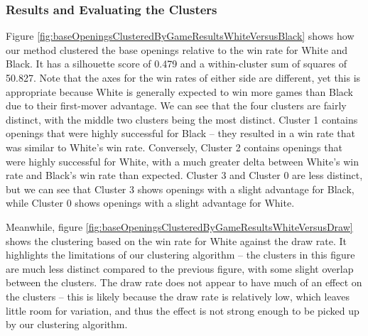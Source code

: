 \documentclass[a4paper, 11pt]{article}
\begin{document}
\subsubsection{Results and Evaluating the Clusters}
Figure \ref{fig:baseOpeningsClusteredByGameResultsWhiteVersusBlack} shows how our method clustered the base openings relative to the win rate for White and Black. It has a silhouette score of 0.479 and a within-cluster sum of squares of 50.827. Note that the axes for the win rates of either side are different, yet this is appropriate because White is generally expected to win more games than Black due to their first-mover advantage. We can see that the four clusters are fairly distinct, with the middle two clusters being the most distinct. Cluster 1 contains openings that were highly successful for Black -- they resulted in a win rate that was similar to White's win rate. Conversely, Cluster 2 contains openings that were highly successful for White, with a much greater delta between White's win rate and Black's win rate than expected. Cluster 3 and Cluster 0 are less distinct, but we can see that Cluster 3 shows openings with a slight advantage for Black, while Cluster 0 shows openings with a slight advantage for White.

Meanwhile, figure \ref{fig:baseOpeningsClusteredByGameResultsWhiteVersusDraw} shows the clustering based on the win rate for White against the draw rate. It highlights the limitations of our clustering algorithm -- the clusters in this figure are much less distinct compared to the previous figure, with some slight overlap between the clusters. The draw rate does not appear to have much of an effect on the clusters -- this is likely because the draw rate is relatively low, which leaves little room for variation, and thus the effect is not strong enough to be picked up by our clustering algorithm.
\end{document}
